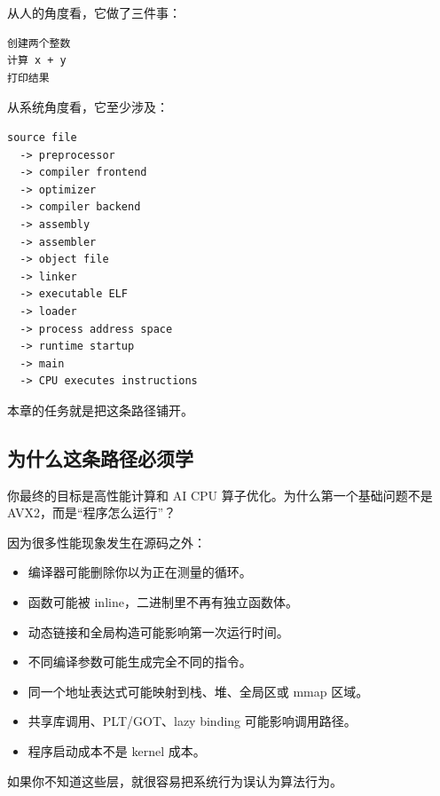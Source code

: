 从人的角度看，它做了三件事：

\begin{center}
\begin{minipage}{0.65\linewidth}
\begin{verbatim}
创建两个整数
计算 x + y
打印结果
\end{verbatim}
\end{minipage}
\end{center}

从系统角度看，它至少涉及：

\begin{center}
\begin{minipage}{0.82\linewidth}
\begin{verbatim}
source file
  -> preprocessor
  -> compiler frontend
  -> optimizer
  -> compiler backend
  -> assembly
  -> assembler
  -> object file
  -> linker
  -> executable ELF
  -> loader
  -> process address space
  -> runtime startup
  -> main
  -> CPU executes instructions
\end{verbatim}
\end{minipage}
\end{center}

本章的任务就是把这条路径铺开。

\subsection{为什么这条路径必须学}

你最终的目标是高性能计算和 AI CPU 算子优化。为什么第一个基础问题不是 AVX2，而是“程序怎么运行”？

因为很多性能现象发生在源码之外：

\begin{itemize}
  \item 编译器可能删除你以为正在测量的循环。
  \item 函数可能被 inline，二进制里不再有独立函数体。
  \item 动态链接和全局构造可能影响第一次运行时间。
  \item 不同编译参数可能生成完全不同的指令。
  \item 同一个地址表达式可能映射到栈、堆、全局区或 mmap 区域。
  \item 共享库调用、PLT/GOT、lazy binding 可能影响调用路径。
  \item 程序启动成本不是 kernel 成本。
\end{itemize}

如果你不知道这些层，就很容易把系统行为误认为算法行为。

